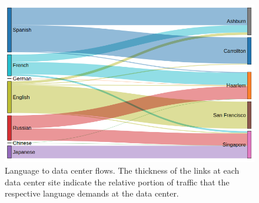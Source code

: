 \begin{figure}[h!]\centering
    \includegraphics[scale=0.4]{main-chapters/images/lang_dc_sankey.png}
    \caption[Language to Data Center Site Sankey Diagram]{Language to data center flows. The thickness of the links at each data center site indicate the relative portion of traffic that the respective language demands at the data center.}
    \label{land_dc_sankey}
    \end{figure}